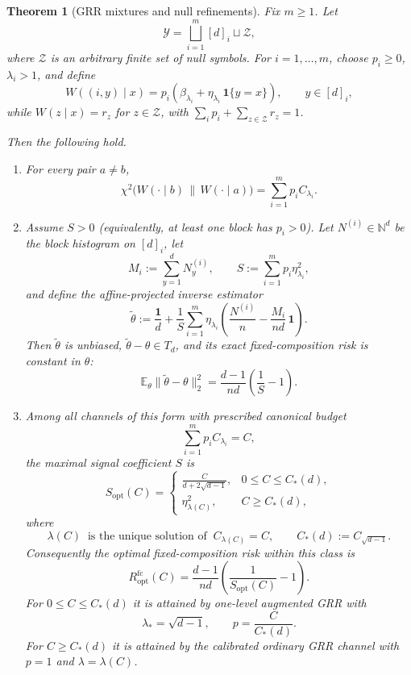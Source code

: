 \documentclass[11pt]{amsart}
\numberwithin{equation}{section}
\newtheorem{theorem}{Theorem}[section]
\theoremstyle{definition}
\newcommand{\N}{\mathbb N}
\newcommand{\E}{\mathbb E}
\newcommand{\one}{\mathbf 1}
\begin{document}
\begin{theorem}[GRR mixtures and null refinements]\label{thm:grr-mixtures}
Fix \(m\ge 1\).  Let
\[
\mathcal Y=\bigsqcup_{i=1}^m [d]_i \sqcup \mathcal Z,
\]
where \(\mathcal Z\) is an arbitrary finite set of null symbols.
For \(i=1,\dots,m\), choose \(p_i\ge 0\), \(\lambda_i>1\), and define
\[
W((i,y)\mid x)
=
p_i\left(
\beta_{\lambda_i}+\eta_{\lambda_i}\,\one\{y=x\}
\right),
\qquad
y\in[d]_i,
\]
while \(W(z\mid x)=r_z\) for \(z\in\mathcal Z\), with \(\sum_i p_i+\sum_{z\in\mathcal Z}r_z=1\).

Then the following hold.

\begin{enumerate}[label=\textup{(\roman*)}]
\item For every pair \(a\neq b\),
\[
\chi^2\!\bigl(W(\cdot\mid b)\,\|\,W(\cdot\mid a)\bigr)
=
\sum_{i=1}^m p_i C_{\lambda_i}. \tag{10.2}\label{eq:mix-chi}
\]

\item Assume \(S>0\) (equivalently, at least one block has \(p_i>0\)).
Let \(N^{(i)}\in\N^d\) be the block histogram on \([d]_i\), let
\[
M_i:=\sum_{y=1}^d N_y^{(i)},
\qquad
S:=\sum_{i=1}^m p_i\eta_{\lambda_i}^2,
\]
and define the affine-projected inverse estimator
\[
\widetilde\theta
:=
\frac{\one}{d}
+
\frac{1}{S}\sum_{i=1}^m \eta_{\lambda_i}
\left(
\frac{N^{(i)}}{n}-\frac{M_i}{nd}\,\one
\right). \tag{10.3}\label{eq:mix-estimator}
\]
Then \(\widetilde\theta\) is unbiased, \(\widetilde\theta-\theta\in T_d\), and its exact
fixed-composition risk is constant in \(\theta\):
\[
\E_\theta\|\widetilde\theta-\theta\|_2^2
=
\frac{d-1}{nd}\left(\frac{1}{S}-1\right). \tag{10.4}\label{eq:mix-risk}
\]

\item Among all channels of this form with prescribed canonical budget
\[
\sum_{i=1}^m p_i C_{\lambda_i}=C,
\]
the maximal signal coefficient \(S\) is
\[
S_{\mathrm{opt}}(C)
=
\begin{cases}
\displaystyle \frac{C}{d+2\sqrt{d-1}}, & 0\le C\le C_\ast(d),\\[1.2ex]
\displaystyle \eta_{\lambda(C)}^2, & C\ge C_\ast(d),
\end{cases} \tag{10.5}\label{eq:S-frontier}
\]
where
\[
\lambda(C)\ \text{ is the unique solution of }\ C_{\lambda(C)}=C,
\qquad
C_\ast(d):=C_{\sqrt{d-1}}.
\]
Consequently the optimal fixed-composition risk within this class is
\[
R^{\mathrm{fc}}_{\mathrm{opt}}(C)
=
\frac{d-1}{nd}\left(\frac{1}{S_{\mathrm{opt}}(C)}-1\right). \tag{10.6}\label{eq:mix-opt-risk}
\]
For \(0\le C\le C_\ast(d)\) it is attained by one-level augmented GRR with
\[
\lambda_\ast=\sqrt{d-1},
\qquad
p=\frac{C}{C_\ast(d)}. \tag{10.7}\label{eq:opt-low-budget}
\]
For \(C\ge C_\ast(d)\) it is attained by the calibrated ordinary GRR channel with \(p=1\) and
\(\lambda=\lambda(C)\).
\end{enumerate}
\end{theorem}
\end{document}
